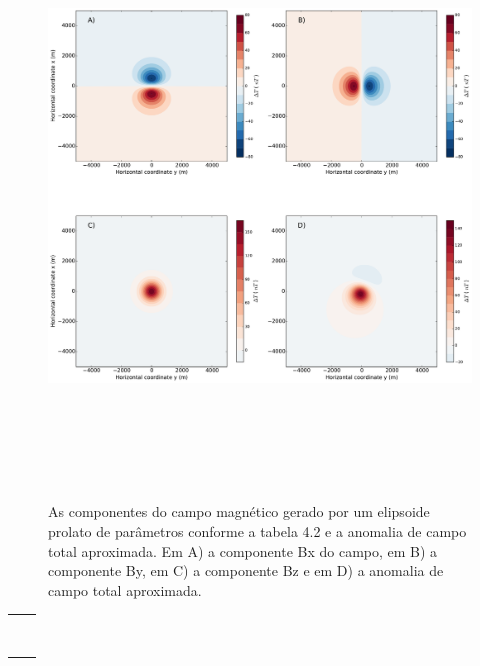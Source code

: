 \begin{figure}[hbt!]
	\centering \includegraphics[width=16cm,height=16cm]{figures/ellipsoid_prolate}
	\caption[As componentes do campo magnético gerado por um elipsoide prolato e a anomalia de campo total aproximada.]{As componentes 
		do campo magnético gerado por um elipsoide prolato de parâmetros conforme a tabela 4.2 e a anomalia de campo total aproximada. Em A) a componente Bx do campo, em B) a componente By, em C) a componente Bz e em D) a anomalia de campo total aproximada.}
	\label{fig:prolate}
\end{figure}

\begin{table}[h!]
	\begin{center}
		\begin{tabular}{lc}
			
			&  \\
			& \\
			& \\
			& \\
			& \\
			& \\ 
			& \\
			& \\
		\end{tabular}
	\end{center}
\end{table}

